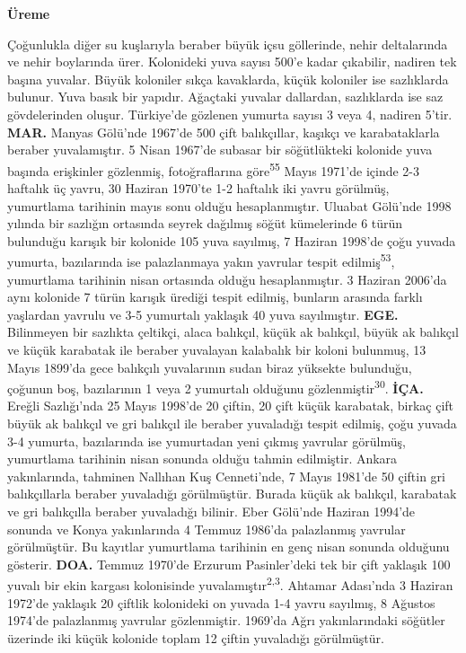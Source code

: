 \documentclass[
  letterpaper,
  DIV=11,
  numbers=noendperiod]{scrreprt}
\begin{document}
\textbf{Üreme}

Çoğunlukla diğer su kuşlarıyla beraber büyük içsu göllerinde, nehir
deltalarında ve nehir boylarında ürer. Kolonideki yuva sayısı 500'e
kadar çıkabilir, nadiren tek başına yuvalar. Büyük koloniler sıkça
kavaklarda, küçük koloniler ise sazlıklarda bulunur. Yuva basık bir
yapıdır. Ağaçtaki yuvalar dallardan, sazlıklarda ise saz gövdelerinden
oluşur. Türkiye'de gözlenen yumurta sayısı 3 veya 4, nadiren 5'tir.
\textbf{MAR.} Manyas Gölü'nde 1967'de 500 çift balıkçıllar, kaşıkçı ve
karabataklarla beraber yuvalamıştır. 5 Nisan 1967'de subasar bir
söğütlükteki kolonide yuva başında erişkinler gözlenmiş, fotoğraflarına
göre\textsuperscript{55} Mayıs 1971'de içinde 2-3 haftalık üç yavru, 30
Haziran 1970'te 1-2 haftalık iki yavru görülmüş, yumurtlama tarihinin
mayıs sonu olduğu hesaplanmıştır. Uluabat Gölü'nde 1998 yılında bir
sazlığın ortasında seyrek dağılmış söğüt kümelerinde 6 türün bulunduğu
karışık bir kolonide 105 yuva sayılmış, 7 Haziran 1998'de çoğu yuvada
yumurta, bazılarında ise palazlanmaya yakın yavrular tespit
edilmiş\textsuperscript{53}, yumurtlama tarihinin nisan ortasında olduğu
hesaplanmıştır. 3 Haziran 2006'da aynı kolonide 7 türün karışık ürediği
tespit edilmiş, bunların arasında farklı yaşlardan yavrulu ve 3-5
yumurtalı yaklaşık 40 yuva sayılmıştır. \textbf{EGE.} Bilinmeyen bir
sazlıkta çeltikçi, alaca balıkçıl, küçük ak balıkçıl, büyük ak balıkçıl
ve küçük karabatak ile beraber yuvalayan kalabalık bir koloni bulunmuş,
13 Mayıs 1899'da gece balıkçılı yuvalarının sudan biraz yüksekte
bulunduğu, çoğunun boş, bazılarının 1 veya 2 yumurtalı olduğunu
gözlenmiştir\textsuperscript{30}. \textbf{İÇA.} Ereğli Sazlığı'nda 25
Mayıs 1998'de 20 çiftin, 20 çift küçük karabatak, birkaç çift büyük ak
balıkçıl ve gri balıkçıl ile beraber yuvaladığı tespit edilmiş, çoğu
yuvada 3-4 yumurta, bazılarında ise yumurtadan yeni çıkmış yavrular
görülmüş, yumurtlama tarihinin nisan sonunda olduğu tahmin edilmiştir.
Ankara yakınlarında, tahminen Nallıhan Kuş Cenneti'nde, 7 Mayıs 1981'de
50 çiftin gri balıkçıllarla beraber yuvaladığı görülmüştür. Burada küçük
ak balıkçıl, karabatak ve gri balıkçılla beraber yuvaladığı bilinir.
Eber Gölü'nde Haziran 1994'de sonunda ve Konya yakınlarında 4 Temmuz
1986'da palazlanmış yavrular görülmüştür. Bu kayıtlar yumurtlama
tarihinin en genç nisan sonunda olduğunu gösterir. \textbf{DOA.} Temmuz
1970'de Erzurum Pasinler'deki tek bir çift yaklaşık 100 yuvalı bir ekin
kargası kolonisinde yuvalamıştır\textsuperscript{2,3}. Ahtamar Adası'nda
3 Haziran 1972'de yaklaşık 20 çiftlik kolonideki on yuvada 1-4 yavru
sayılmış, 8 Ağustos 1974'de palazlanmış yavrular gözlenmiştir. 1969'da
Ağrı yakınlarındaki söğütler üzerinde iki küçük kolonide toplam 12
çiftin yuvaladığı görülmüştür.
\end{document}
